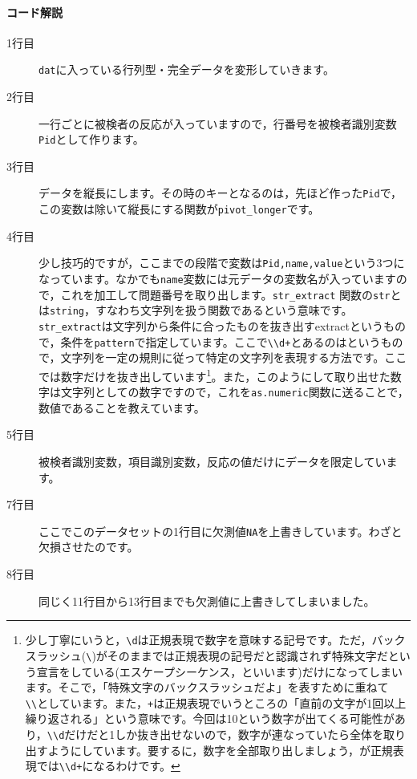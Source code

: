 \documentclass{ltjsbook}
\begin{document}
\paragraph{コード解説}
\begin{description}
	\item[1行目] \verb|dat|に入っている行列型・完全データを変形していきます。
	\item[2行目] 一行ごとに被検者の反応が入っていますので，行番号を被検者識別変数\verb|Pid|として作ります。
	\item[3行目] データを縦長にします。その時のキーとなるのは，先ほど作った\verb|Pid|で，この変数は除いて縦長にする関数が\verb|pivot_longer|です。
	\item[4行目] 少し技巧的ですが，ここまでの段階で変数は\verb|Pid,name,value|という3つになっています。なかでも\verb|name|変数には元データの変数名が入っていますので，これを加工して問題番号を取り出します。\verb|str_extract| 関数の\verb|str|とは\verb|string|，すなわち文字列を扱う関数であるという意味です。\verb|str_extract|は文字列から条件に合ったものを抜き出すextractというもので，条件を\verb|pattern|で指定しています。ここで\verb|\\d+|とあるのはというもので，文字列を一定の規則に従って特定の文字列を表現する方法です。ここでは数字だけを抜き出しています\footnote{少し丁寧にいうと，\verb|\d|は正規表現で数字を意味する記号です。ただ，バックスラッシュ(\verb|\|)がそのままでは正規表現の記号だと認識されず特殊文字だという宣言をしている(エスケープシーケンス，といいます)だけになってしまいます。そこで，「特殊文字のバックスラッシュだよ」を表すために重ねて\verb|\\|としています。また，\verb|+|は正規表現でいうところの「直前の文字が1回以上繰り返される」という意味です。今回は10という数字が出てくる可能性があり，\verb|\\d|だけだと1しか抜き出せないので，数字が連なっていたら全体を取り出すようにしています。要するに，数字を全部取り出しましょう，が正規表現では\verb|\\d+|になるわけです。}。また，このようにして取り出せた数字は文字列としての数字ですので，これを\verb|as.numeric|関数に送ることで，数値であることを教えています。
	\item[5行目] 被検者識別変数，項目識別変数，反応の値だけにデータを限定しています。
	\item[7行目] ここでこのデータセットの1行目に欠測値\verb|NA|を上書きしています。わざと欠損させたのです。
	\item[8行目] 同じく11行目から13行目までも欠測値に上書きしてしまいました。
\end{description}
\end{document}
